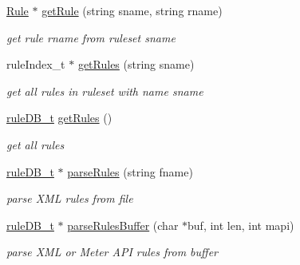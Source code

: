 \begin{DoxyCompactItemize}
\mbox{\label{classRuleManager_aa7ce90c80d7c6e167d5fe396b9310985}} 
\hyperlink{classRule}{Rule} $\ast$ \hyperlink{classRuleManager_aa7ce90c80d7c6e167d5fe396b9310985}{get\+Rule} (string sname, string rname)
\begin{DoxyCompactList}\small\item\em get rule rname from ruleset sname \end{DoxyCompactList}\item 
\mbox{\label{classRuleManager_abe81485b01b2db580370da44f0d86f37}} 
rule\+Index\+\_\+t $\ast$ \hyperlink{classRuleManager_abe81485b01b2db580370da44f0d86f37}{get\+Rules} (string sname)
\begin{DoxyCompactList}\small\item\em get all rules in ruleset with name sname \end{DoxyCompactList}\item 
\mbox{\label{classRuleManager_ac2968da0034fbf6603f08b8b83817a0a}} 
\hyperlink{RuleFileParser_8h_a7d5bb94bb17a8a1d92db2a89a0cc96d1}{rule\+D\+B\+\_\+t} \hyperlink{classRuleManager_ac2968da0034fbf6603f08b8b83817a0a}{get\+Rules} ()
\begin{DoxyCompactList}\small\item\em get all rules \end{DoxyCompactList}\item 
\mbox{\label{classRuleManager_a90df59d4ab10d4e31e239c1a136bd410}} 
\hyperlink{RuleFileParser_8h_a7d5bb94bb17a8a1d92db2a89a0cc96d1}{rule\+D\+B\+\_\+t} $\ast$ \hyperlink{classRuleManager_a90df59d4ab10d4e31e239c1a136bd410}{parse\+Rules} (string fname)
\begin{DoxyCompactList}\small\item\em parse X\+ML rules from file \end{DoxyCompactList}\item 
\mbox{\label{classRuleManager_a79c110f6566aab42fbab44d9efbc449f}} 
\hyperlink{RuleFileParser_8h_a7d5bb94bb17a8a1d92db2a89a0cc96d1}{rule\+D\+B\+\_\+t} $\ast$ \hyperlink{classRuleManager_a79c110f6566aab42fbab44d9efbc449f}{parse\+Rules\+Buffer} (char $\ast$buf, int len, int mapi)
\begin{DoxyCompactList}\small\item\em parse X\+ML or Meter A\+PI rules from buffer \end{DoxyCompactList}\item 

\end{DoxyCompactItemize}
